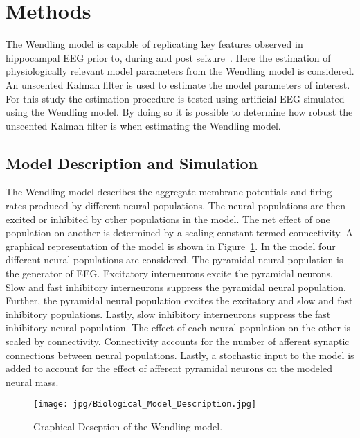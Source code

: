 \section{Methods}

The Wendling model is capable of replicating key features observed in hippocampal EEG prior to, during and post seizure~\citep{wendling2002epileptic}. Here the estimation of physiologically relevant model parameters from the Wendling model is considered. An unscented Kalman filter is used to estimate the model parameters of interest. For this study the estimation procedure is tested using artificial EEG simulated using the Wendling model. By doing so it is possible to determine how robust the unscented Kalman filter is when estimating the Wendling model.

\subsection{Model Description and Simulation}


The Wendling model describes the aggregate membrane potentials and firing rates produced by different neural populations. The neural populations are then excited or inhibited by other populations in the model. The net effect of one population on another is determined by a scaling constant termed connectivity. A graphical representation of the model is shown in Figure~\ref{fig: Biological}. In the model four different neural populations are considered. The pyramidal neural population is the generator of EEG. Excitatory interneurons excite the pyramidal neurons. Slow and fast inhibitory interneurons suppress the pyramidal neural population. Further, the pyramidal neural population excites the excitatory and slow and fast inhibitory populations. Lastly, slow inhibitory interneurons suppress the fast inhibitory neural population. The effect of each neural population on the other is scaled by connectivity. Connectivity accounts for the number of afferent synaptic connections between neural populations.  Lastly, a stochastic input to the model is added to account for the effect of afferent pyramidal neurons on the modeled neural mass.
\begin{figure}  %
	\centering
		\texttt{[image: jpg/Biological\_Model\_Description.jpg]}
	\caption{Graphical Descption of the Wendling model.}
	\label{fig: Biological}
\end{figure}

